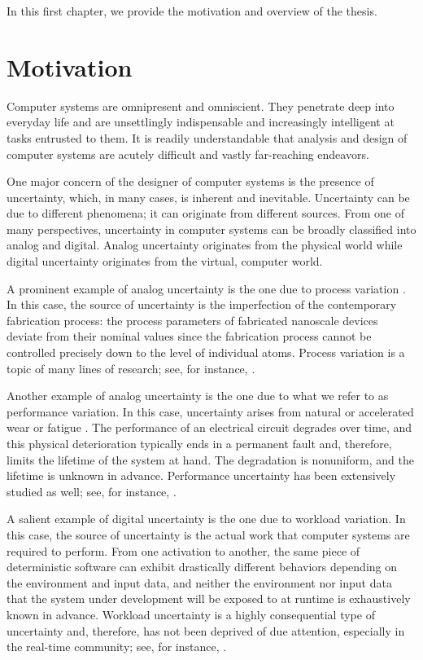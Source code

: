 In this first chapter, we provide the motivation and overview of the thesis.

\section{Motivation}

Computer systems are omnipresent and omniscient. They penetrate deep into
everyday life and are unsettlingly indispensable and increasingly intelligent at
tasks entrusted to them. It is readily understandable that analysis and design
of computer systems are acutely difficult and vastly far-reaching endeavors.

One major concern of the designer of computer systems is the presence of
uncertainty, which, in many cases, is inherent and inevitable. Uncertainty can
be due to different phenomena; it can originate from different sources. From one
of many perspectives, uncertainty in computer systems can be broadly classified
into analog and digital. Analog uncertainty originates from the physical world
while digital uncertainty originates from the virtual, computer world.

A prominent example of analog uncertainty is the one due to process variation
\cite{srivastava2010}. In this case, the source of uncertainty is the
imperfection of the contemporary fabrication process: the process parameters of
fabricated nanoscale devices deviate from their nominal values since the
fabrication process cannot be controlled precisely down to the level of
individual atoms. Process variation is a topic of many lines of research; see,
for instance, \cite{bhardwaj2006, bhardwaj2008, chandra2010, juan2012, lee2013}.

Another example of analog uncertainty is the one due to what we refer to as
performance variation. In this case, uncertainty arises from natural or
accelerated wear or fatigue \cite{jedec2016}. The performance of an electrical
circuit degrades over time, and this physical deterioration typically ends in a
permanent fault and, therefore, limits the lifetime of the system at hand. The
degradation is nonuniform, and the lifetime is unknown in advance. Performance
uncertainty has been extensively studied as well; see, for instance,
\cite{coskun2006, huang2009b, das2014c}.

A salient example of digital uncertainty is the one due to workload variation.
In this case, the source of uncertainty is the actual work that computer systems
are required to perform. From one activation to another, the same piece of
deterministic software can exhibit drastically different behaviors depending on
the environment and input data, and neither the environment nor input data that
the system under development will be exposed to at runtime is exhaustively known
in advance. Workload uncertainty is a highly consequential type of uncertainty
and, therefore, has not been deprived of due attention, especially in the
real-time community; see, for instance, \cite{diaz2002, santinelli2011,
quinton2012, tanasa2015}.

